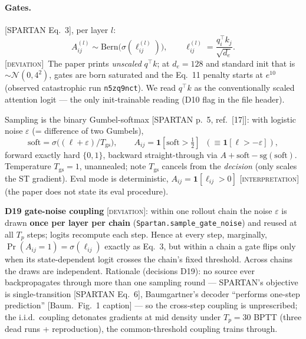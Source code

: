 \documentclass[11pt]{article}
\newcommand{\code}[1]{\texttt{\small #1}}
\newcommand{\paper}[1]{\textcolor{blue!60!black}{[#1]}}
\newcommand{\interp}{\textcolor{orange!80!black}{[\textsc{interpretation}]}}
\newcommand{\dev}{\textcolor{red!70!black}{[\textsc{deviation}]}}
\begin{document}
\paragraph{Gates.} \paper{SPARTAN Eq.~3}, per layer $l$:
\[
  A^{(l)}_{ij} \sim \mathrm{Bern}\big(\sigma(\ell^{(l)}_{ij})\big),
  \qquad
  \ell^{(l)}_{ij} = \frac{q_i^\top k_j}{\sqrt{d_e}}.
\]
\dev{}~The paper prints \emph{unscaled} $q^\top k$; at $d_e=128$ and standard init that is
$\sim\mathcal N(0,4^2)$, gates are born saturated and the Eq.~11 penalty starts at $e^{10}$
(observed catastrophic run \code{n5zq9nct}). We read $q^\top k$ as the conventionally
scaled attention logit --- the only init-trainable reading (D10 flag in the file header).

Sampling is the binary Gumbel-softmax \paper{SPARTAN p.~5, ref.\ [17]}: with logistic noise
$\varepsilon$ (= difference of two Gumbels),
\[
  \mathrm{soft} = \sigma\!\big((\ell + \varepsilon)/T_{\mathrm{gs}}\big),\qquad
  A_{ij} = \mathbf{1}[\mathrm{soft} > \tfrac12] \;\;(\equiv \mathbf{1}[\ell > -\varepsilon]),
\]
forward exactly hard $\{0,1\}$, backward straight-through via
$A + \mathrm{soft} - \mathrm{sg}(\mathrm{soft})$. Temperature
$T_{\mathrm{gs}}=1$, unannealed; note $T_{\mathrm{gs}}$ cancels from the \emph{decision}
(only scales the ST gradient). Eval mode is deterministic, $A_{ij} = \mathbf{1}[\ell_{ij}>0]$
\interp{} (the paper does not state its eval procedure).

\textbf{D19 gate-noise coupling} \dev{}: within one rollout chain the noise $\varepsilon$
is drawn \textbf{once per layer per chain} (\code{Spartan.sample\_gate\_noise}) and reused
at all $T_p$ steps; logits recompute each step. Hence at every step, marginally,
$\Pr(A_{ij}{=}1) = \sigma(\ell_{ij})$ exactly as Eq.~3, but within a chain a gate flips
only when its state-dependent logit crosses the chain's fixed threshold. Across chains the
draws are independent. Rationale (decisions D19): no source ever backpropagates through
more than one sampling round --- SPARTAN's objective is single-transition
\paper{SPARTAN Eq.~6}, Baumgartner's decoder ``performs one-step prediction''
\paper{Baum.\ Fig.~1 caption} --- so the cross-step coupling is unprescribed; the i.i.d.\
coupling detonates gradients at mid density under $T_p{=}30$ BPTT (three dead runs +
reproduction), the common-threshold coupling trains through.
\end{document}
